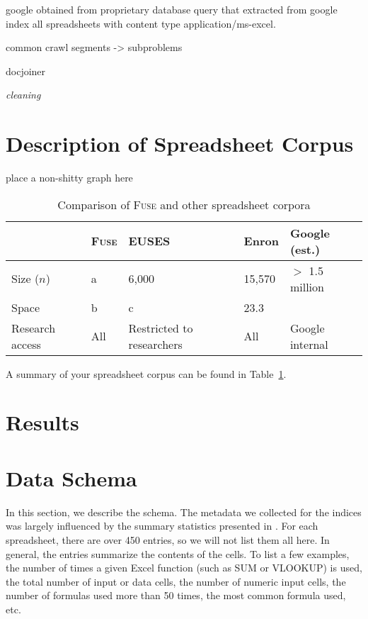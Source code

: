 \documentclass[conference]{IEEEtran}
\begin{document}
google obtained from proprietary database query that extracted from google index all spreadsheets with content type application/ms-excel.

common crawl
segments -> subproblems

docjoiner

\emph{cleaning}

\section{Description of Spreadsheet Corpus}



place a non-shitty graph here

\begin{table}[!t]
\caption{Comparison of \textsc{Fuse} and other spreadsheet corpora\label{tab:corpora}}
\centering
\begin{tabular}{lllll}
\toprule
& \textbf{\textsc{Fuse}} & \textbf{EUSES} & \textbf{Enron} & \textbf{Google (est.)}\\
\midrule
Size ($n$) & a & 6,000 & 15,570 & $>$ 1.5 million \\
Space & b & c & 23.3\\
Research access & All & Restricted to researchers & All & Google internal\\
\bottomrule
\end{tabular}
\end{table}

A summary of your spreadsheet corpus can be found in Table~\ref{tab:corpora}.

\section{Results}


\section{Data Schema}
\label{sec:schema}
In this section, we describe the schema.
The metadata we collected for the indices was largely influenced by the summary statistics presented in \cite{Fisher2005}.  
For each spreadsheet, there are over 450 entries, so we will not list them all here.
In general, the entries summarize the contents of the cells.
To list a few examples, the number of times a given Excel function (such as SUM or VLOOKUP) is used, the total number of input or data cells, the number of numeric input cells, the number of formulas used more than 50 times, the most common formula used, etc.
\end{document}
